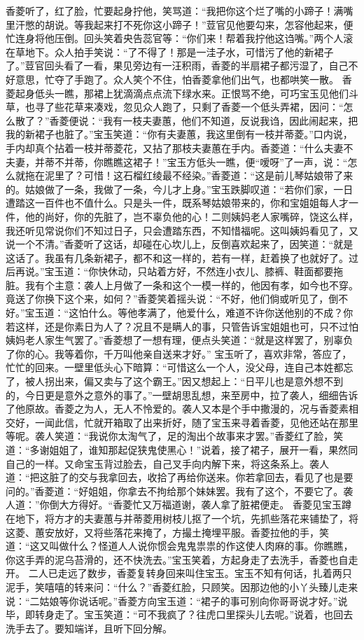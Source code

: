 \documentclass[12pt,oneside]{book}
\begin{document}
香菱听了，红了脸，忙要起身拧他，笑骂道：“我把你这个烂了嘴的小蹄子！满嘴里汗憋的胡说。等我起来打不死你这小蹄子！”荳官见他要勾来，怎容他起来，便忙连身将他压倒。回头笑着央告蕊官等：“你们来！帮着我拧他这诌嘴。”两个人滚在草地下。众人拍手笑说：“了不得了！那是一洼子水，可惜污了他的新裙子了。”荳官回头看了一看，果见旁边有一汪积雨，香菱的半扇裙子都污湿了，自己不好意思，忙夺了手跑了。众人笑个不住，怕香菱拿他们出气，也都哄笑一散。
香菱起身低头一瞧，那裙上犹滴滴点点流下绿水来。正恨骂不绝，可巧宝玉见他们斗草，也寻了些花草来凑戏，忽见众人跑了，只剩了香菱一个低头弄裙，因问：“怎么散了？”香菱便说：“我有一枝夫妻蕙，他们不知道，反说我诌，因此闹起来，把我的新裙子也脏了。”宝玉笑道：“你有夫妻蕙，我这里倒有一枝并蒂菱。”口内说，手内却真个拈着一枝并蒂菱花，又拈了那枝夫妻蕙在手内。香菱道：“什么夫妻不夫妻，并蒂不并蒂，你瞧瞧这裙子！”宝玉方低头一瞧，便“嗳呀”了一声，说：“怎么就拖在泥里了？可惜！这石榴红绫最不经染。”香菱道：“这是前儿琴姑娘带了来的。姑娘做了一条，我做了一条，今儿才上身。”宝玉跌脚叹道：“若你们家，一日遭踏这一百件也不值什么。只是头一件，既系琴姑娘带来的，你和宝姐姐每人才一件，他的尚好，你的先脏了，岂不辜负他的心！二则姨妈老人家嘴碎，饶这么样，我还听见常说你们不知过日子，只会遭踏东西，不知惜福呢。这叫姨妈看见了，又说一个不清。”香菱听了这话，却碰在心坎儿上，反倒喜欢起来了，因笑道：“就是这话了。我虽有几条新裙子，都不和这一样的，若有一样，赶着换了也就好了。过后再说。”宝玉道：“你快休动，只站着方好，不然连小衣儿、膝裤、鞋面都要拖脏。我有个主意：袭人上月做了一条和这个一模一样的，他因有孝，如今也不穿。竟送了你换下这个来，如何？”香菱笑着摇头说：“不好，他们倘或听见了，倒不好。”宝玉道：“这怕什么。等他孝满了，他爱什么，难道不许你送他别的不成？你若这样，还是你素日为人了？况且不是瞒人的事，只管告诉宝姐姐也可，只不过怕姨妈老人家生气罢了。”香菱想了一想有理，便点头笑道：“就是这样罢了，别辜负了你的心。我等着你，千万叫他亲自送来才好。”
宝玉听了，喜欢非常，答应了，忙忙的回来。一壁里低头心下暗算：“可惜这么一个人，没父母，连自己本姓都忘了，被人拐出来，偏又卖与了这个霸王。”因又想起上：“日平儿也是意外想不到的，今日更是意外之意外的事了。”一壁胡思乱想，来至房中，拉了袭人，细细告诉了他原故。香菱之为人，无人不怜爱的。袭人又本是个手中撒漫的，况与香菱素相交好，一闻此信，忙就开箱取了出来折好，随了宝玉来寻着香菱，见他还站在那里等呢。袭人笑道：“我说你太淘气了，足的淘出个故事来才罢。”香菱红了脸，笑道：“多谢姐姐了，谁知那起促狭鬼使黑心！”说着，接了裙子，展开一看，果然同自己的一样。又命宝玉背过脸去，自己叉手向内解下来，将这条系上。袭人道：“把这脏了的交与我拿回去，收拾了再给你送来。你若拿回去，看见了也是要问的。”香菱道：“好姐姐，你拿去不拘给那个妹妹罢。我有了这个，不要它了。袭人道：”你倒大方得好。“香菱忙又万福道谢，袭人拿了脏裙便走。
香菱见宝玉蹲在地下，将方才的夫妻蕙与并蒂菱用树枝儿抠了一个坑，先抓些落花来铺垫了，将这菱、蕙安放好，又将些落花来掩了，方撮土掩埋平服。香菱拉他的手，笑道：“这又叫做什么？怪道人人说你惯会鬼鬼祟祟的作这使人肉麻的事。你瞧瞧，你这手弄的泥乌苔滑的，还不快洗去。”宝玉笑着，方起身走了去洗手，香菱也自走开。
二人已走远了数步，香菱复转身回来叫住宝玉。宝玉不知有何话，扎着两只泥手，笑嘻嘻的转来问：“什么？”香菱红脸，只顾笑。因那边他的小丫头臻儿走来说：“二姑娘等你说话呢。”香菱方向宝玉道：“裙子的事可别向你哥哥说才好。”说毕，即转身走了。宝玉笑道：“可不我疯了？往虎口里探头儿去呢。”说着，也回去洗手去了。要知端详，且听下回分解。
\end{document}
